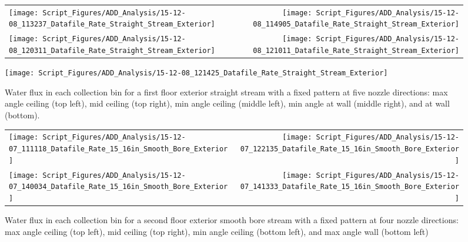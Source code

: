 \documentclass[12pt,oneside]{book}
\begin{document}
\begin{figure}[ht]
\begin{tabular*}{\textwidth}{lr}
\texttt{[image: Script\_Figures/ADD\_Analysis/15-12-08\_113237\_Datafile\_Rate\_Straight\_Stream\_Exterior]} &
\texttt{[image: Script\_Figures/ADD\_Analysis/15-12-08\_114905\_Datafile\_Rate\_Straight\_Stream\_Exterior]} \\
\texttt{[image: Script\_Figures/ADD\_Analysis/15-12-08\_120311\_Datafile\_Rate\_Straight\_Stream\_Exterior]} &
\texttt{[image: Script\_Figures/ADD\_Analysis/15-12-08\_121011\_Datafile\_Rate\_Straight\_Stream\_Exterior]} \\
\end{tabular*}
\centering
\texttt{[image: Script\_Figures/ADD\_Analysis/15-12-08\_121425\_Datafile\_Rate\_Straight\_Stream\_Exterior]} \\
\caption[Water Flux for Varying Nozzle Direction with Fixed First Floor Exterior Straight Stream]{Water flux in each collection bin for a first floor exterior straight stream with a fixed pattern at five nozzle directions: max angle ceiling (top left), mid ceiling (top right), min angle ceiling (middle left), min angle at wall (middle right), and at wall (bottom).}
\label{fig:Exterior_First_Floor_Varying_Nozzle_Directions_SS_Fixed_Pattern}
\end{figure}

\begin{figure}[ht]
\begin{tabular*}{\textwidth}{lr}
\texttt{[image: Script\_Figures/ADD\_Analysis/15-12-07\_111118\_Datafile\_Rate\_15\_16in\_Smooth\_Bore\_Exterior]} &
\texttt{[image: Script\_Figures/ADD\_Analysis/15-12-07\_122135\_Datafile\_Rate\_15\_16in\_Smooth\_Bore\_Exterior]} \\
\texttt{[image: Script\_Figures/ADD\_Analysis/15-12-07\_140034\_Datafile\_Rate\_15\_16in\_Smooth\_Bore\_Exterior]} &
\texttt{[image: Script\_Figures/ADD\_Analysis/15-12-07\_141333\_Datafile\_Rate\_15\_16in\_Smooth\_Bore\_Exterior]} \\
\end{tabular*}
\caption[Water Flux for Varying Nozzle Direction with Fixed Second Floor Exterior Smooth Bore Stream]{Water flux in each collection bin for a second floor exterior smooth bore stream with a fixed pattern at four nozzle directions: max angle ceiling (top left), mid ceiling (top right), min angle ceiling (bottom left), and max angle wall (bottom left)}
\label{fig:Exterior_Second_Floor_Varying_Nozzle_Directions_SB_Fixed_Pattern}
\end{figure}
\end{document}

